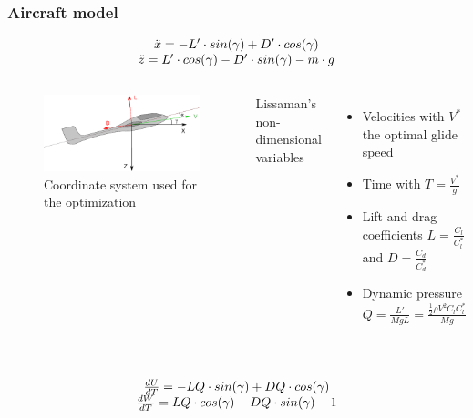 \documentclass[compress]{beamer}
\begin{document}
\begin{frame}
  \frametitle{Aircraft model}
  \begin{equation*}
    \begin{array}[c]{c}
      \ddot{x}= -L' \cdot sin(\gamma) + D' \cdot cos(\gamma) \\
      \ddot{z}= L' \cdot cos(\gamma) - D' \cdot sin(\gamma) - m \cdot g \\
    \end{array}
  \end{equation*}
  \begin{columns}
    \begin{figure}[h]
      \centering
      \includegraphics[width=1\textwidth]{./Figures/glider.eps}
      \caption{Coordinate system used for the optimization}
    \end{figure}
    Lissaman's non-dimensional variables
    \begin{itemize}
      \item Velocities with $V^{*}$ the optimal glide speed
      \item Time with $T=\frac{V^{*}}{g}$
      \item Lift and drag coefficients $L= \frac{C_l}{C_l^*}$ and $D= \frac{C_d}{C_d^*}$
      \item Dynamic pressure $Q = \frac{L'}{MgL} = \frac{\frac{1}{2} \rho V^2 C_l C_l^* }{Mg}$
    \end{itemize}
  \end{columns}
  \begin{equation*}
    \begin{array}[c]{c}
      \\
      \frac{dU}{dT}= -LQ \cdot sin(\gamma) + DQ \cdot cos(\gamma) \\
      \frac{dW}{dT}= LQ \cdot cos(\gamma) - DQ \cdot sin(\gamma) - 1
    \end{array}
  \end{equation*}
\end{frame}
\end{document}
